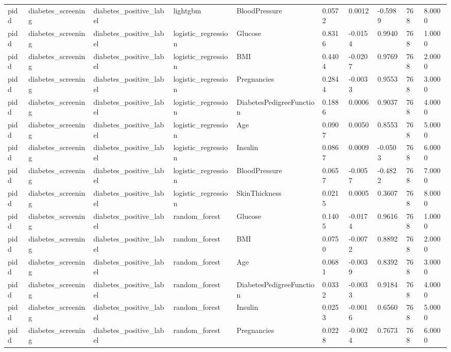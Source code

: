 \begin{tabular}{llllllllll}
pidd & diabetes\_screening & diabetes\_positive\_label & lightgbm & BloodPressure & 0.0572 & 0.0012 & -0.5989 & 768 & 8.0000 \\
pidd & diabetes\_screening & diabetes\_positive\_label & logistic\_regression & Glucose & 0.8316 & -0.0154 & 0.9940 & 768 & 1.0000 \\
pidd & diabetes\_screening & diabetes\_positive\_label & logistic\_regression & BMI & 0.4404 & -0.0207 & 0.9769 & 768 & 2.0000 \\
pidd & diabetes\_screening & diabetes\_positive\_label & logistic\_regression & Pregnancies & 0.2844 & -0.0033 & 0.9553 & 768 & 3.0000 \\
pidd & diabetes\_screening & diabetes\_positive\_label & logistic\_regression & DiabetesPedigreeFunction & 0.1886 & 0.0006 & 0.9037 & 768 & 4.0000 \\
pidd & diabetes\_screening & diabetes\_positive\_label & logistic\_regression & Age & 0.0907 & 0.0050 & 0.8553 & 768 & 5.0000 \\
pidd & diabetes\_screening & diabetes\_positive\_label & logistic\_regression & Insulin & 0.0867 & 0.0009 & -0.0503 & 768 & 6.0000 \\
pidd & diabetes\_screening & diabetes\_positive\_label & logistic\_regression & BloodPressure & 0.0657 & -0.0057 & -0.4822 & 768 & 7.0000 \\
pidd & diabetes\_screening & diabetes\_positive\_label & logistic\_regression & SkinThickness & 0.0215 & 0.0005 & 0.3607 & 768 & 8.0000 \\
pidd & diabetes\_screening & diabetes\_positive\_label & random\_forest & Glucose & 0.1405 & -0.0174 & 0.9616 & 768 & 1.0000 \\
pidd & diabetes\_screening & diabetes\_positive\_label & random\_forest & BMI & 0.0750 & -0.0072 & 0.8892 & 768 & 2.0000 \\
pidd & diabetes\_screening & diabetes\_positive\_label & random\_forest & Age & 0.0681 & -0.0039 & 0.8392 & 768 & 3.0000 \\
pidd & diabetes\_screening & diabetes\_positive\_label & random\_forest & DiabetesPedigreeFunction & 0.0332 & -0.0033 & 0.9184 & 768 & 4.0000 \\
pidd & diabetes\_screening & diabetes\_positive\_label & random\_forest & Insulin & 0.0253 & -0.0016 & 0.6560 & 768 & 5.0000 \\
pidd & diabetes\_screening & diabetes\_positive\_label & random\_forest & Pregnancies & 0.0228 & -0.0024 & 0.7673 & 768 & 6.0000 \\

\end{tabular}
